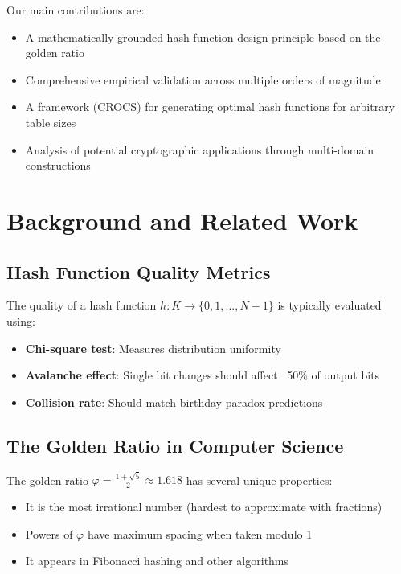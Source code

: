 \documentclass[11pt,a4paper]{article}
\theoremstyle{definition}
\newcommand{\crocs}{\textsc{CROCS}}
\begin{document}
Our main contributions are:
\begin{itemize}
\item A mathematically grounded hash function design principle based on the golden ratio
\item Comprehensive empirical validation across multiple orders of magnitude
\item A framework (\crocs{}) for generating optimal hash functions for arbitrary table sizes
\item Analysis of potential cryptographic applications through multi-domain constructions
\end{itemize}

\section{Background and Related Work}

\subsection{Hash Function Quality Metrics}

The quality of a hash function $h: K \rightarrow \{0, 1, \ldots, N-1\}$ is typically evaluated using:

\begin{itemize}
\item \textbf{Chi-square test}: Measures distribution uniformity
\item \textbf{Avalanche effect}: Single bit changes should affect ~50\% of output bits
\item \textbf{Collision rate}: Should match birthday paradox predictions
\end{itemize}

\subsection{The Golden Ratio in Computer Science}

The golden ratio $\varphi = \frac{1 + \sqrt{5}}{2} \approx 1.618$ has several unique properties:
\begin{itemize}
\item It is the most irrational number (hardest to approximate with fractions)
\item Powers of $\varphi$ have maximum spacing when taken modulo 1
\item It appears in Fibonacci hashing and other algorithms
\end{itemize}
\end{document}
